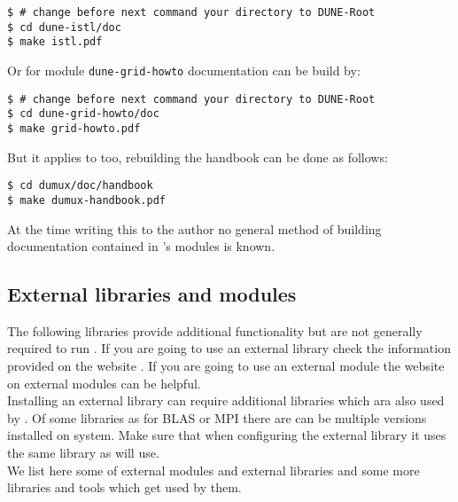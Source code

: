 \begin{lstlisting}[style=Bash]
$ # change before next command your directory to DUNE-Root
$ cd dune-istl/doc
$ make istl.pdf
\end{lstlisting}

Or for module \texttt{dune-grid-howto} documentation can be build by: 

\begin{lstlisting}[style=Bash]
$ # change before next command your directory to DUNE-Root
$ cd dune-grid-howto/doc
$ make grid-howto.pdf
\end{lstlisting}

But it applies to \Dumux too, rebuilding the handbook can be done as follows:

\begin{lstlisting}[style=Bash]
$ cd dumux/doc/handbook
$ make dumux-handbook.pdf
\end{lstlisting}


At the time writing this to the author no general method of building documentation contained in \Dune's modules is known.


\subsection{External libraries and modules} \label{sec:external-modules-libraries}

The following libraries provide additional functionality but are not generally required to run \Dumux. 
If you are going to use an external library check the information provided on the \Dune website \cite{DUNE-EXT-LIB}.
If you are going to use an external \Dune module the website on external modules \cite{DUNE-EXT-MOD} can be helpful.\\


Installing an external library can require additional libraries which ara also used by \Dune. 
Of some libraries as for BLAS or MPI there are can be multiple versions installed on system.
Make sure that when configuring the external library it uses the same library as \Dune will use.\\

We list here some of external modules and external libraries and some more libraries and tools which get used by them.

